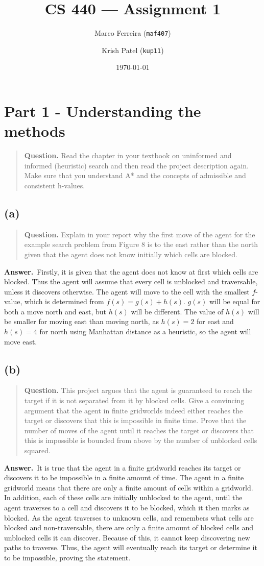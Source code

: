 \documentclass[11pt]{article}
\title{CS 440 --- Assignment 1}
\author{
Marco Ferreira (\texttt{maf407}) \and
Krish Patel (\texttt{kup11})
}
\date{\today}
\newcommand{\question}[1]{%
\begin{quote}
\textbf{Question.} #1
\end{quote}
}
\newcommand{\answer}{\textbf{Answer.}\ }
\begin{document}
\maketitle

\section*{Part 1 - Understanding the methods}
\question{Read the chapter in your textbook on uninformed and informed (heuristic) search and then read the project description again. Make sure that you understand A* and the concepts of admissible and consistent h-values.}

\subsection*{(a)}
\question{Explain in your report why the first move of the agent for the example search problem from Figure 8 is to the east rather than the north given that the agent does not know initially which cells are blocked.}

\answer Firstly, it is given that the agent does not know at first which cells are blocked. Thus the agent will assume that every cell is unblocked and traversable, unless it discovers otherwise. The agent will move to the cell with the smallest \(f\)-value, which is determined from \(f(s) = g(s) + h(s)\). \(g(s)\) will be equal for both a move north and east, but \(h(s)\) will be different. The value of \(h(s)\) will be smaller for moving east than moving north, as \(h(s) = 2\) for east and \(h(s) = 4\) for north using Manhattan distance as a heuristic, so the agent will move east.

\subsection*{(b)}
\question{This project argues that the agent is guaranteed to reach the target if it is not separated from it by blocked cells. Give a convincing argument that the agent in finite gridworlds indeed either reaches the target or discovers that this is impossible in finite time. Prove that the number of moves of the agent until it reaches the target or discovers that this is impossible is bounded from above by the number of unblocked cells squared.}

\answer It is true that the agent in a finite gridworld reaches its target or discovers it to be impossible in a finite amount of time. The agent in a finite gridworld means that there are only a finite amount of cells within a gridworld. In addition, each of these cells are initially unblocked to the agent, until the agent traverses to a cell and discovers it to be blocked, which it then marks as blocked. As the agent traverses to unknown cells, and remembers what cells are blocked and non-traversable, there are only a finite amount of blocked cells and unblocked cells it can discover. Because of this, it cannot keep discovering new paths to traverse. Thus, the agent will eventually reach its target or determine it to be impossible, proving the statement.
\end{document}

